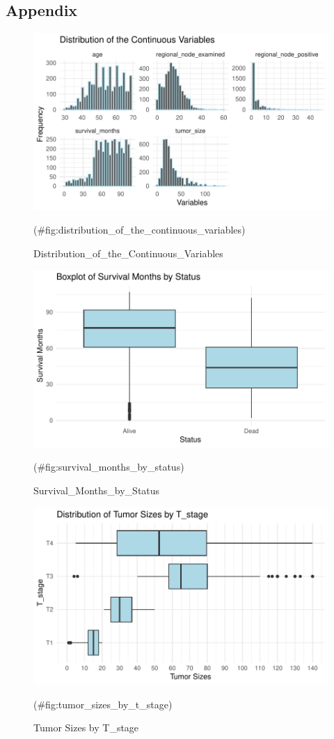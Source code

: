 \documentclass[
]{article}
\begin{document}
\subsection{Appendix}\label{appendix}

\begin{figure}
\includegraphics[width=0.9\linewidth]{P8130_project_report_files/figure-latex/distribution_of_the_continuous_variables-1} \caption{Distribution_of_the_Continuous_Variables}(\#fig:distribution_of_the_continuous_variables)
\end{figure}

\begin{figure}
\includegraphics[width=0.9\linewidth]{P8130_project_report_files/figure-latex/survival_months_by_status-1} \caption{Survival_Months_by_Status}(\#fig:survival_months_by_status)
\end{figure}

\begin{figure}
\includegraphics[width=0.9\linewidth]{P8130_project_report_files/figure-latex/tumor_sizes_by_t_stage-1} \caption{Tumor Sizes by T_stage}(\#fig:tumor_sizes_by_t_stage)
\end{figure}
\end{document}
